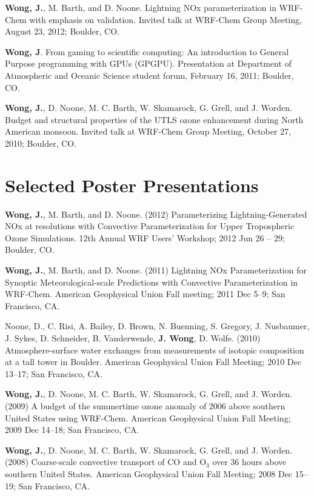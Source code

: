 \documentclass[overlap,12pt,centered]{res}
\begin{document}
\begin{resume}
		\textbf{Wong, J.}, M. Barth, and D. Noone.  Lightning NOx parameterization in WRF-Chem with emphasis on validation.  Invited talk at WRF-Chem Group Meeting, August 23, 2012; Boulder, CO.
		
		\textbf{Wong, J}. From gaming to scientific computing: An introduction to General Purpose programming with GPUs (GPGPU). Presentation at Department of Atmospheric and Oceanic Science student forum, February 16, 2011; Boulder, CO.
		
		\textbf{Wong, J.}, D. Noone, M. C. Barth, W. Skamarock, G. Grell, and J. Worden. Budget and structural properties of the UTLS ozone enhancement during North American monsoon. Invited talk at WRF-Chem Group Meeting, October 27, 2010; Boulder, CO.
		
		
		\section{ \sc Selected Poster Presentations}
		
		\textbf{Wong, J.}, M. Barth, and D. Noone. (2012) Parameterizing Lightning-Generated NOx at resolutions with Convective Parameterization for Upper Tropospheric Ozone Simulations. 12th Annual WRF Users' Workshop; 2012 Jun 26 -- 29; Boulder, CO.
		
		\textbf{Wong, J.}, M. Barth, and D. Noone. (2011) Lightning NOx Parameterization for Synoptic Meteorological-scale Predictions with Convective Parameterization in WRF-Chem. American Geophysical Union Fall meeting; 2011 Dec 5--9; San Francisco, CA.
		
		Noone, D., C. Risi, A. Bailey, D. Brown, N. Buenning, S. Gregory, J. Nusbaumer, J. Sykes, D. Schneider, B. Vanderwende, \textbf{J. Wong}, D. Wolfe. (2010) Atmosphere-surface water exchanges from measurements of isotopic composition at a tall tower in Boulder. American Geophysical Union Fall Meeting; 2010 Dec 13--17; San Francisco, CA.
		
		\textbf{Wong, J.}, D. Noone, M. C. Barth, W. Skamarock, G. Grell, and J. Worden. (2009) A budget of the summertime ozone anomaly of 2006 above southern United States using WRF-Chem. American Geophysical Union Fall Meeting; 2009 Dec 14--18; San Francisco, CA.
		
		\textbf{Wong, J.}, D. Noone, M. C. Barth, W. Skamarock, G. Grell, and J. Worden. (2008) Coarse-scale convective transport of CO and O$_3$ over 36 hours above southern United States. American Geophysical Union Fall Meeting; 2008 Dec 15--19; San Francisco, CA.
		

\end{resume}
\end{document}
